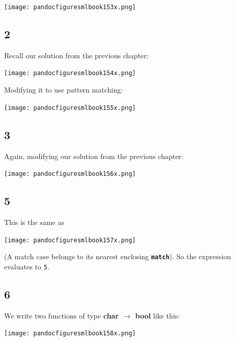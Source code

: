 \documentclass[]{book}
\begin{document}
\medskip
\begin{center}
\noindent\texttt{[image: pandocfiguresmlbook153x.png]}
\end{center}
\medskip

\subsection*{2}
Recall our solution from the previous chapter:

\medskip
\begin{center}
\noindent\texttt{[image: pandocfiguresmlbook154x.png]}
\end{center}
\medskip

\noindent Modifying it to use pattern matching:

\medskip
\begin{center}
\noindent\texttt{[image: pandocfiguresmlbook155x.png]}
\end{center}
\medskip

\subsection*{3}
Again, modifying our solution from the previous chapter:

\medskip
\begin{center}
\noindent\texttt{[image: pandocfiguresmlbook156x.png]}
\end{center}
\medskip

\subsection*{5}
This is the same as

\medskip
\begin{center}
\noindent\texttt{[image: pandocfiguresmlbook157x.png]}
\end{center}
\medskip

\noindent (A match case belongs to its nearest enclosing \textbf{\texttt{match}}). So the expression evaluates to \texttt{5}.

\subsection*{6}
We write two functions of type \textbf{\textsf{char $\rightarrow$ bool}} like this:

\medskip
\begin{center}
\noindent\texttt{[image: pandocfiguresmlbook158x.png]}
\end{center}
\medskip
\end{document}
